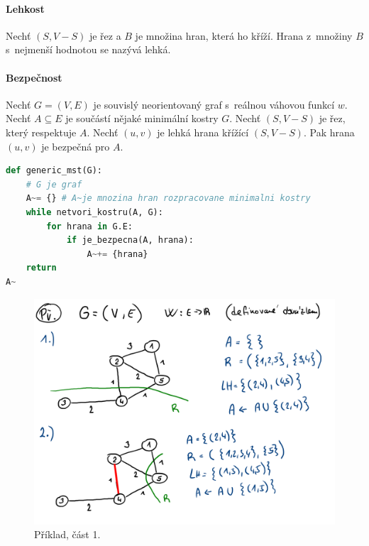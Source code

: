\paragraph*{Lehkost} Nechť $(S, V - S)$ je řez a $B$ je množina hran, která ho kříží. Hrana z~množiny $B$ s~nejmenší hodnotou se nazývá lehká.

\paragraph*{Bezpečnost} Nechť $G = (V, E)$ je souvislý neorientovaný graf s~reálnou váhovou funkcí $w$. Nechť $A \subseteq E$ je součástí nějaké minimální kostry $G$. Nechť $(S, V - S)$ je řez, který respektuje $A$. Nechť $(u, v)$ je lehká hrana křížící $(S, V - S)$. Pak hrana $(u, v)$ je bezpečná pro $A$.

\bigskip\noindent\begin{minipage}{\linewidth}
\begin{lstlisting}[language=Python, caption={Generický algoritmus. Před každou iterací algoritmu je množina $A$ podmnožinou nějaké minimální kostry. Hrana $(u,v) \in E$ je bezpečná pro $A$, pokud $A \cup \{(u, v)\}$ je podmnožinou nějaké minimální kostry.}]
def generic_mst(G):
    # G je graf
    A~= {} # A~je mnozina hran rozpracovane minimalni kostry
    while netvori_kostru(A, G):
        for hrana in G.E:
            if je_bezpecna(A, hrana):
                A~+= {hrana}
    return
A~\end{lstlisting}
\end{minipage}

\begin{figure}[H]
    \centering
    \includegraphics[width=0.9\linewidth]{03-minimalni-kostry-6.pdf}
    \caption{Příklad, část 1.}
\end{figure}

